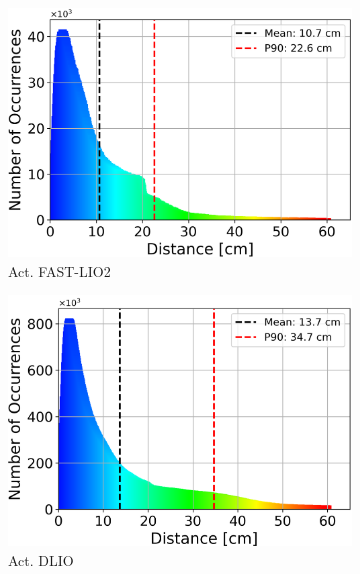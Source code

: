 \documentclass[a4paper, conference]{IEEEtran}
\begin{document}
\begin{figure}
\begin{subfigure}{0.19\textwidth}
    \includegraphics[width=\textwidth]{pics/histogram_results/histogram_cond_actuated_lio.png}
    \caption{Act. FAST-LIO2}
    \label{fig:hist_act_lio}
\end{subfigure}
\hfill
\begin{subfigure}{0.19\textwidth}
    \centering
    \includegraphics[width=\textwidth]{pics/histogram_results/histogram_cond_actuated_dlio.png}
    \caption{Act. DLIO}
    \label{fig:hist_act_dlio}
\end{subfigure}
\hfill
\begin{subfigure}{0.19\textwidth}
    \centering

\end{subfigure}
\end{figure}
\end{document}

